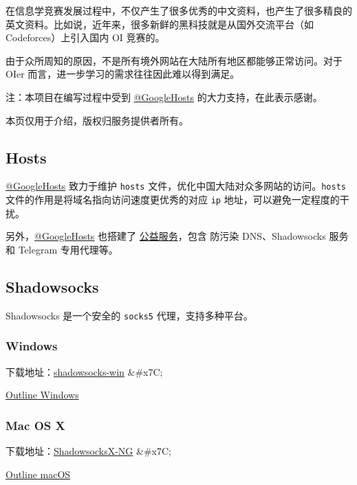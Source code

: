 
在信息学竞赛发展过程中，不仅产生了很多优秀的中文资料，也产生了很多精良的英文资料。比如说，近年来，很多新鲜的黑科技就是从国外交流平台（如 Codeforces）上引入国内 OI 竞赛的。

由于众所周知的原因，不是所有境外网站在大陆所有地区都能够正常访问。对于 OIer 而言，进一步学习的需求往往因此难以得到满足。

注：本项目在编写过程中受到 \href{https://github.com/GoogleHosts/hosts}{@GoogleHosts} 的大力支持，在此表示感谢。

本页仅用于介绍，版权归服务提供者所有。

\subsection{Hosts}

\href{https://github.com/GoogleHosts/hosts}{@GoogleHosts} 致力于维护 \texttt{hosts} 文件，优化中国大陆对众多网站的访问。\texttt{hosts} 文件的作用是将域名指向访问速度更优秀的对应 \texttt{ip} 地址，可以避免一定程度的干扰。

另外，\href{https://github.com/GoogleHosts/hosts}{@GoogleHosts} 也搭建了 \href{https://github.com/googlehosts/hosts/wiki/\%E5%AE%9E%E9%AA%8C%E5%AE%A4}{公益服务}，包含 防污染 DNS、Shadowsocks 服务和 Telegram 专用代理等。

\subsection{Shadowsocks}

Shadowsocks 是一个安全的 \texttt{socks5} 代理，支持多种平台。

\subsubsection{Windows}

下载地址：\href{https://github.com/shadowsocks/shadowsocks-windows/releases}{shadowsocks-win} \&\#x7C;

\href{https://raw.githubusercontent.com/Jigsaw-Code/outline-releases/master/client/Outline-Client.exe}{Outline Windows}

\subsubsection{Mac OS X}

下载地址：\href{https://github.com/shadowsocks/ShadowsocksX-NG/releases}{ShadowsocksX-NG} \&\#x7C;

\href{https://itunes.apple.com/app/outline-app/id1356178125}{Outline macOS}

